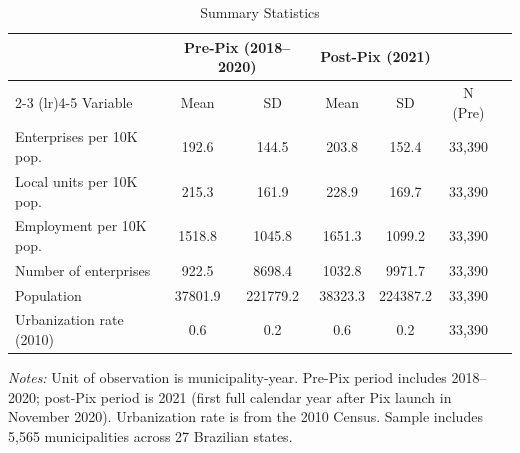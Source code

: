 \begin{table}[htbp]
\centering
\caption{Summary Statistics}
\label{tab:summary}
\begin{tabular}{lcccccc}
\toprule
 & \multicolumn{2}{c}{Pre-Pix (2018--2020)} & \multicolumn{2}{c}{Post-Pix (2021)} & \\
\cmidrule(lr){2-3} \cmidrule(lr){4-5}
Variable & Mean & SD & Mean & SD & N (Pre) \\
\midrule
Enterprises per 10K pop. & 192.6 & 144.5 & 203.8 & 152.4 & 33,390 \\
Local units per 10K pop. & 215.3 & 161.9 & 228.9 & 169.7 & 33,390 \\
Employment per 10K pop. & 1518.8 & 1045.8 & 1651.3 & 1099.2 & 33,390 \\
Number of enterprises & 922.5 & 8698.4 & 1032.8 & 9971.7 & 33,390 \\
Population & 37801.9 & 221779.2 & 38323.3 & 224387.2 & 33,390 \\
Urbanization rate (2010) & 0.6 & 0.2 & 0.6 & 0.2 & 33,390 \\
\bottomrule
\end{tabular}
\begin{tablenotes}
\item \textit{Notes:} Unit of observation is municipality-year. Pre-Pix period includes 2018--2020; post-Pix period is 2021 (first full calendar year after Pix launch in November 2020). Urbanization rate is from the 2010 Census. Sample includes 5,565 municipalities across 27 Brazilian states.
\end{tablenotes}
\end{table}
